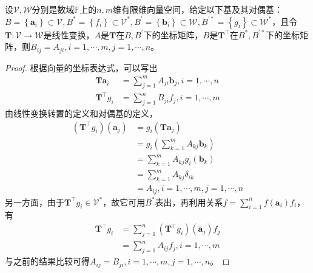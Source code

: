 \documentclass[main.tex]{subfiles}
\begin{document}
\begin{theorem}\label{thm:II.2.19}
    设$\mathcal{V},\mathcal{W}$分别是数域$\mathbb{F}$上的$n,m$维有限维向量空间，给定以下基及其对偶基：$B=\left\{\mathbf{a}_i\right\}\subset\mathcal{V},B^*=\left\{f_i\right\}\subset\mathcal{V}^*,B^\prime=\left\{\mathbf{b}_i\right\}\subset\mathcal{W},B^{\prime *}=\left\{g_i\right\}\subset\mathcal{W}^*$，且令$\mathbf{T}:\mathcal{V}\rightarrow\mathcal{W}$是线性变换，$A$是$\mathbf{T}$在$B,B^\prime$下的坐标矩阵，$B$是$\mathbf{T}^\intercal$在$B^*,B^{\prime *}$下的坐标矩阵，则$B_{ij}=A_{ji},i=1,\cdots,m,j=1,\cdots,n$。
\end{theorem}
\begin{proof}
    根据向量的坐标表达式，可以写出
    \begin{align*}
        \mathbf{Ta}_i            & =\sum_{j=1}^mA_{ji}\mathbf{b}_j,i=1,\cdots,n \\
        \mathbf{T}^\intercal g_i & =\sum_{j=1}^nB_{ji}f_j,i=1,\cdots,m
    \end{align*}
    由线性变换转置的定义和对偶基的定义，
    \begin{align*}
        \left(\mathbf{T}^\intercal g_i\right)\left(\mathbf{a}_j\right) & =g_i\left(\mathbf{Ta}_j\right)                    \\
                                                                       & =g_i\left(\sum_{k=1}^m A_{kj}\mathbf{b}_k\right)  \\
                                                                       & =\sum_{k=1}^m A_{kj} g_i\left(\mathbf{b}_k\right) \\
                                                                       & =\sum_{k=1}^mA_{kj}\delta_{ik}                    \\
                                                                       & =A_{ij},i=1,\cdots,m,j=1,\cdots,n
    \end{align*}
    另一方面，由于$\mathbf{T}^\intercal g_i\in\mathcal{V}^*$，故它可用$B^*$表出，再利用关系$f=\sum_{i=1}^nf\left(\mathbf{a}_i\right)f_i$，有
    \begin{align*}
        \mathbf{T}^\intercal g_i & =\sum_{j=1}^n\left(\mathbf{T}^\intercal g_i\right)\left(\mathbf{a}_j\right) f_j \\
                                 & =\sum_{j=1}^n A_{ij}f_j,i=1,\cdots,m
    \end{align*}
    与之前的结果比较可得$A_{ij}=B_{ji},i=1,\cdots,m,j=1,\cdots,n$。
\end{proof}
\end{document}
